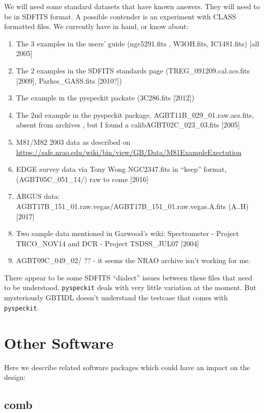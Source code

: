 \documentclass[12pt,a4paper]{article}
\begin{document}
We will need some standard datasets that have known answers. They will need to be in SDFITS format.
A possible contender is an experiment with CLASS formatted files. We currently have in hand,
or know about:

\begin{enumerate}

\item
  The 3 examples in the users' guide (ngc5291.fits , W3OH.fits, IC1481.fits) [all 2005]
\item
  The 2 examples in the SDFITS standards page (TREG\_091209.cal.acs.fits [2009], Parkes\_GASS.fits [2010?])
\item
  The example in the pyspeckit packate (3C286.fits [2012])
\item  
  The 2nd example in the pyspeckit package, AGBT11B\_029\_01.raw.acs.fits, absent from archives , but I found a calibAGBT02C\_023\_03.fits [2005]
\item
  M81/M82 2003 data as described on\newline
  \url{https://safe.nrao.edu/wiki/bin/view/GB/Data/M81ExampleExectution}
\item
  EDGE survey data via Tony Wong NGC2347.fits in ``keep'' format, (AGBT05C\_051\_14/) raw to come [2016]
\item
  ARGUS data: AGBT17B\_151\_01.raw.vegas/AGBT17B\_151\_01.raw.vegas.A.fits (A..H) [2017]
\item
  Two sample data mentioned in Garwood's wiki: Spectrometer - Project TRCO\_NOV14 and DCR - Project TSDSS\_JUL07 [2004]
\item
  AGBT09C\_049\_02/ ??  - it seems the NRAO archive isn't working for me.
\end{enumerate}

There appear to be some SDFITS ``dialect'' issues between these files that need to be understood.
{\tt pyspeckit} deals with very little variation at the moment. But mysteriously GBTIDL doesn't understand the
testcase that comes with {\tt pyspeckit}.

\section{Other Software}

Here we describe related software packages which could have an impact on the design:

\subsection{comb}
\end{document}
